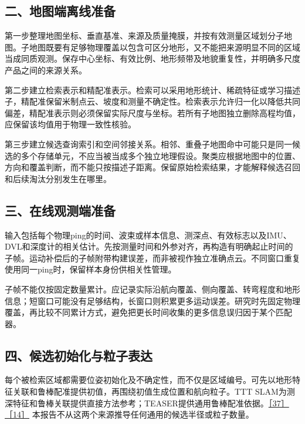 \hypertarget{ux4e8cux5730ux56feux7aefux79bbux7ebfux51c6ux5907}{%
\subsection{二、地图端离线准备}\label{ux4e8cux5730ux56feux7aefux79bbux7ebfux51c6ux5907}}

第一步整理地图坐标、垂直基准、来源及质量掩膜，并按有效测量区域划分子地图。子地图既要有足够物理覆盖以包含可区分地形，又不能把来源明显不同的区域当成同质观测。保存中心坐标、有效比例、地形频带及地貌重复性，并明确多尺度产品之间的来源关系。

第二步建立检索表示和精配准表示。检索可以采用地形统计、稀疏特征或学习描述子，精配准保留米制点云、坡度和测量不确定性。检索表示允许归一化以降低共同偏差，精配准表示则必须保留实际尺度与坐标。若所有子地图独立删除高程均值，应保留该均值用于物理一致性核验。

第三步建立候选查询索引和空间邻接关系。相邻、重叠子地图命中可能只是同一候选的多个存储单元，不应当被当成多个独立地理假设。聚类应根据地图中的位置、方向和覆盖判断，而不能只按描述子距离。保留原始检索结果，才能解释候选召回和后续淘汰分别发生在哪里。

\hypertarget{ux4e09ux5728ux7ebfux89c2ux6d4bux7aefux51c6ux5907}{%
\subsection{三、在线观测端准备}\label{ux4e09ux5728ux7ebfux89c2ux6d4bux7aefux51c6ux5907}}

输入包括每个物理ping的时间、波束或样本信息、测深点、有效标志以及IMU、DVL和深度计的相关估计。先按测量时间和外参对齐，再构造有明确起止时间的子帧。运动补偿后的子帧附带构建误差，而非被视作独立准确点云。不同窗口重复使用同一ping时，保留样本身份供相关性管理。

子帧不能仅按固定数量累计。应记录实际沿航向覆盖、侧向覆盖、转弯程度和地形信息；短窗口可能没有足够结构，长窗口则积累更多运动误差。研究时先固定物理覆盖，再比较不同累计方式，避免把更长时间收集的更多信息误归因于某个匹配器。

\hypertarget{ux56dbux5019ux9009ux521dux59cbux5316ux4e0eux7c92ux5b50ux8868ux8fbe}{%
\subsection{四、候选初始化与粒子表达}\label{ux56dbux5019ux9009ux521dux59cbux5316ux4e0eux7c92ux5b50ux8868ux8fbe}}

每个被检索区域都需要位姿初始化及不确定性，而不仅是区域编号。可先以地形特征关联和鲁棒配准提供初值，再围绕初值生成位置和航向粒子。TTT SLAM为测深特征和鲁棒关联提供直接方法参考；TEASER提供通用鲁棒配准依据。\href{https://www.sciencedirect.com/science/article/pii/S0029801824001148}{［37］}\href{https://arxiv.org/abs/2001.07715}{［14］} 本报告不从这两个来源推导任何通用的候选半径或粒子数量。

